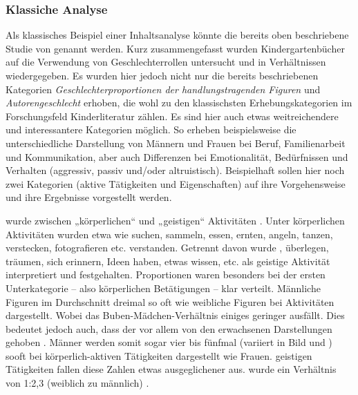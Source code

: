     \subsubsection{Klassiche Analyse}

      Als klassisches Beispiel einer Inhaltsanalyse könnte die bereits oben
      beschriebene Studie von \citeauthor{Schmerl1988} genannt werden. Kurz
      zusammengefasst wurden Kindergartenbücher auf die Verwendung von
      Geschlechterrollen untersucht und in Verhältnissen wiedergegeben. Es
      wurden hier jedoch nicht nur die bereits beschriebenen Kategorien
      \emph{Geschlechterproportionen der handlungstragenden Figuren} und
      \emph{Autorengeschlecht} erhoben, die wohl zu den klassischsten
      Erhebungskategorien im Forschungsfeld Kinderliteratur zählen. Es sind hier
      auch etwas weitreichendere und interessantere Kategorien möglich. So
      erheben \citeauthor{Schmerl1988} beispielsweise die unterschiedliche
      Darstellung von Männern und Frauen bei Beruf, Familienarbeit und
      Kommunikation, aber auch Differenzen bei Emotionalität, Bedürfnissen und
      Verhalten (aggressiv, passiv und/oder altruistisch).
      \parencite{Schmerl1988} Beispielhaft sollen hier noch zwei Kategorien
      (aktive Tätigkeiten und Eigenschaften) auf ihre Vorgehensweise und ihre
      Ergebnisse vorgestellt werden.


        \Dabei wurde zwischen „körperlichen“ und „geistigen“ Aktivitäten
        \unterschieden. Unter körperlichen Aktivitäten wurden etwa
         wie suchen, sammeln, essen, ernten, angeln, tanzen,
        \sich verstecken, fotografieren etc. verstanden. Getrennt davon wurde
        \denken, überlegen, träumen, sich erinnern, Ideen haben, etwas wissen,
         etc. als geistige Aktivität interpretiert und festgehalten.
        \Die Proportionen waren besonders bei der ersten Unterkategorie – also
        \den körperlichen Betätigungen -- klar verteilt. Männliche Figuren
        \wurden im Durchschnitt dreimal so oft wie weibliche Figuren bei
        \derartigen Aktivitäten dargestellt. Wobei das Buben-Mädchen-Verhältnis
        \um einiges geringer ausfällt. Dies bedeutet jedoch auch, dass der
        \Durchschnittswert vor allem von den erwachsenen Darstellungen gehoben
        \wird. Männer werden somit sogar vier bis fünfmal (variiert in Bild und
        \Text) sooft bei körperlich-aktiven Tätigkeiten dargestellt wie Frauen.
        \Bei geistigen Tätigkeiten fallen diese Zahlen etwas ausgeglichener aus.
        \Durchschnittlich wurde ein Verhältnis von 1:2,3 (weiblich zu männlich)
        \festgehalten. \parencite[139]{Schmerl1988}
  

